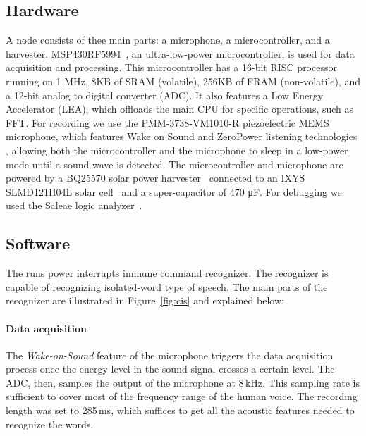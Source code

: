 \subsection{Hardware}
\label{sec:hardware}
A \cim node consists of thee main parts: a microphone, a microcontroller, and a harvester. MSP430RF5994~\cite{ti_msp430_website}, an ultra-low-power microcontroller, is used for data acquisition and processing. This microcontroller has a 16-bit RISC processor running on 1 MHz, 8KB of SRAM (volatile), 256KB of FRAM (non-volatile), and a 12-bit analog to digital converter (ADC). It also features a Low Energy Accelerator (LEA), which offloads the main CPU for specific operations, such as FFT. For recording we use the PMM-3738-VM1010-R piezoelectric MEMS microphone, which features Wake on Sound and ZeroPower listening technologies \cite{microphone}, allowing both the microcontroller and the microphone to sleep in a low-power mode until a sound wave is detected.
The microcontroller and microphone are powered by a BQ25570 solar power harvester~\cite{BQ25570EVM-206_website} connected to an IXYS SLMD121H04L solar cell~\cite{SLMD121H04L_website} and a super-capacitor of 470 \si{\micro F}. For debugging we used the Saleae logic analyzer~\cite{saleae}.

\subsection{Software}
\label{sec:software}
The \cim runs power interrupts immune command recognizer. The recognizer is capable of recognizing isolated-word type of speech. 
The main parts of the recognizer are illustrated in Figure~\ref{fig:cis} and explained below:

\paragraph{Data acquisition}
The \textit{Wake-on-Sound} feature of the microphone triggers the data acquisition process once the energy level in the sound signal crosses a certain level. The ADC, then, samples the output of the microphone at 8\,kHz. This sampling rate is sufficient to cover most of the frequency range of the human voice. The recording length was set to 285\,ms, which suffices to get all the acoustic features needed to recognize the words.


